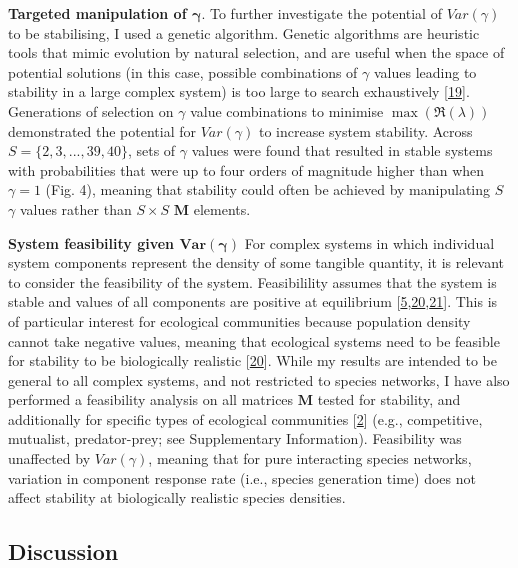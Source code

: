 \documentclass[]{article}
\begin{document}
\textbf{Targeted manipulation of \(\mathbf{\gamma}\)}. To further
investigate the potential of \(Var(\gamma)\) to be stabilising, I used a
genetic algorithm. Genetic algorithms are heuristic tools that mimic
evolution by natural selection, and are useful when the space of
potential solutions (in this case, possible combinations of \(\gamma\)
values leading to stability in a large complex system) is too large to
search exhaustively {[}\protect\hyperlink{ref-Hamblin2013}{19}{]}.
Generations of selection on \(\gamma\) value combinations to minimise
\(\max\left(\Re(\lambda)\right)\) demonstrated the potential for
\(Var(\gamma)\) to increase system stability. Across
\(S = \{2, 3, ..., 39, 40\}\), sets of \(\gamma\) values were found that
resulted in stable systems with probabilities that were up to four
orders of magnitude higher than when \(\gamma = 1\) (Fig. 4), meaning
that stability could often be achieved by manipulating \(S\) \(\gamma\)
values rather than \(S \times S\) \(\mathbf{M}\) elements.

\textbf{System feasibility given \(\mathbf{Var(\gamma)}\)} For complex
systems in which individual system components represent the density of
some tangible quantity, it is relevant to consider the feasibility of
the system. Feasibilility assumes that the system is stable and values
of all components are positive at equilibrium
{[}\protect\hyperlink{ref-Grilli2017}{5},\protect\hyperlink{ref-Dougoud2018}{20},\protect\hyperlink{ref-Song2018}{21}{]}.
This is of particular interest for ecological communities because
population density cannot take negative values, meaning that ecological
systems need to be feasible for stability to be biologically realistic
{[}\protect\hyperlink{ref-Dougoud2018}{20}{]}. While my results are
intended to be general to all complex systems, and not restricted to
species networks, I have also performed a feasibility analysis on all
matrices \(\mathbf{M}\) tested for stability, and additionally for
specific types of ecological communities
{[}\protect\hyperlink{ref-Allesina2012}{2}{]} (e.g., competitive,
mutualist, predator-prey; see Supplementary Information). Feasibility
was unaffected by \(Var(\gamma)\), meaning that for pure interacting
species networks, variation in component response rate (i.e., species
generation time) does not affect stability at biologically realistic
species densities.

\subsection{Discussion}\label{discussion}
\end{document}
